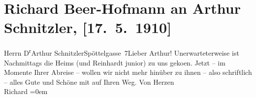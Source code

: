 

         
         \renewcommand{\erwaehntePersonen}{Personen: Else Heims, Wolfgang Reinhardt}
         \renewcommand{\erwaehnteOrte}{Orte: Edmund-Weiß-Gasse, Wien}
         \renewcommand{\erwaehnteWerke}{}
               \section[Richard Beer-Hofmann an Arthur Schnitzler, {[}17. 5. 1910{]}]{ Richard Beer-Hofmann an Arthur Schnitzler, {[}17. 5. 1910{]}}\nopagebreak{}\rehead{ }\begin{ledgroupsized}[t]{13cm}\normalsize\beginnumbering \toendnotes[C]{\smallbreak\pagebreak[2]} 
\pstart{}{\pb}Herrn D\textsuperscript{r}\pend{}\pstart{}Arthur Schnitzler\pend{}\pstart{}Spöttelgasse 7\pend{}{\bigskip}\pstart{}{\pb}Lieber Arthur!\pend\pstart
           Unerwarteterweise ist Nachmittags die Heims (und Reinhardt junior) zu uns
                  geko{\geminationm}en. Jetzt – im Momente Ihrer Abreise – wollen
               wir nicht {\pb}mehr hinüber zu ihnen –
               also schriftlich – alles Gute und Schöne mit auf Ihren Weg.\pend
           \pstart
           Von Herzen{\\[\baselineskip]}\spacefill\mbox{Richard}\pend
           \leftskip=0em{}
         
         \endnumbering{}\end{ledgroupsized}  \newcommand{\dateiname}{L01932}\newcommand{\titel}{Richard Beer-Hofmann an Arthur Schnitzler, [17. 5. 1910]}\newcommand{\editorInnen}{Martin Anton Müller und Gerd-Hermann Susen}
      